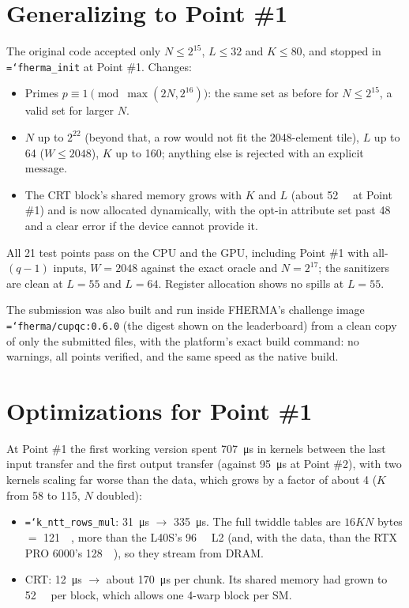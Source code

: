 \documentclass[11pt,a4paper]{article}
\newcommand{\code}[1]{\texttt{\hyphenchar\font=`\-\relax #1}}
\newcommand{\us}[1]{\SI{#1}{\micro\second}}
\newcommand{\MB}[1]{\SI{#1}{\mega\byte}}
\begin{document}
\section{Generalizing to Point \#1}

The original code accepted only $N \le 2^{15}$, $L \le 32$ and $K \le 80$, and stopped
in \code{fherma\_init} at Point \#1. Changes:
\begin{itemize}[leftmargin=*]
\item Primes $p \equiv 1 \pmod{\max(2N, 2^{16})}$: the same set as before for
  $N \le 2^{15}$, a valid set for larger $N$.
\item $N$ up to $2^{22}$ (beyond that, a row would not fit the 2048-element tile),
  $L$ up to 64 ($W \le 2048$), $K$ up to 160; anything else is rejected with an
  explicit message.
\item The CRT block's shared memory grows with $K$ and $L$ (about \SI{52}{\kilo\byte}
  at Point \#1) and is now allocated dynamically, with the opt-in attribute set past
  \SI{48}{\kilo\byte} and a clear error if the device cannot provide it.
\end{itemize}
All 21 test points pass on the CPU and the GPU, including Point \#1 with all-$(q-1)$
inputs, $W = 2048$ against the exact oracle and $N = 2^{17}$; the sanitizers are clean
at $L = 55$ and $L = 64$. Register allocation shows no spills at $L = 55$.

The submission was also built and run inside FHERMA's challenge image
\code{fherma/cupqc:0.6.0} (the digest shown on the leaderboard) from a clean copy of
only the submitted files, with the platform's exact build command: no warnings, all
points verified, and the same speed as the native build.

\section{Optimizations for Point \#1}

At Point \#1 the first working version spent \us{707} in kernels between the last
input transfer and the first output transfer (against \us{95} at Point \#2), with two
kernels scaling far worse than the data, which grows by a factor of about 4 ($K$ from 58
to 115, $N$ doubled):
\begin{itemize}[leftmargin=*]
\item \code{k\_ntt\_rows\_mul}: \us{31} $\to$ \us{335}. The full twiddle tables are
  $16 K N$ bytes $=$ \MB{121}, more than the L40S's \SI{96}{\mega\byte} L2 (and, with the
  data, than the RTX PRO 6000's \SI{128}{\mega\byte}), so they stream from DRAM.
\item CRT: \us{12} $\to$ about \us{170} per chunk. Its shared memory had grown to
  \SI{52}{\kilo\byte} per block, which allows one 4-warp block per SM.
\end{itemize}
\end{document}
